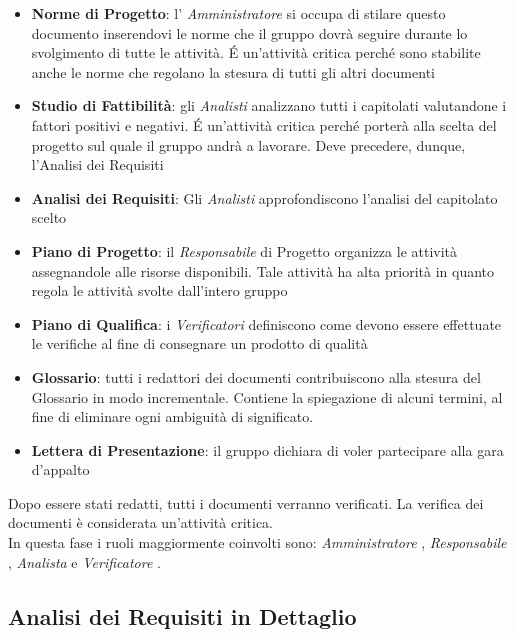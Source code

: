 \begin{itemize}
\item \textbf{Norme di Progetto}: l’ \emph{Amministratore}  si occupa di stilare questo documento
  inserendovi le norme che il gruppo dovrà seguire durante lo svolgimento di tutte
  le attività. \'E un'attività critica perché sono stabilite anche le norme
  che regolano la stesura di tutti gli altri documenti

\item \textbf{Studio di Fattibilità}: gli  \emph{Analisti}  analizzano tutti i capitolati valutandone
  i fattori positivi e negativi. \'E un'attività critica perché porterà alla scelta del
  progetto sul quale il gruppo andrà a lavorare. Deve precedere, dunque, l'Analisi dei
  Requisiti

\item \textbf{Analisi dei Requisiti}: Gli  \emph{Analisti}  approfondiscono l'analisi del capitolato
  scelto

\item \textbf{Piano di Progetto}: il  \emph{Responsabile}  di Progetto organizza le attività assegnandole
  alle risorse disponibili. Tale attività ha alta priorità in quanto regola le attività
  svolte dall’intero gruppo

\item \textbf{Piano di Qualifica}: i  \emph{Verificatori}  definiscono come devono essere effettuate le
  verifiche al fine di consegnare un prodotto di qualità

\item \textbf{Glossario}: tutti i redattori dei documenti contribuiscono alla stesura del
  Glossario in modo incrementale. Contiene la spiegazione di alcuni termini, al fine di
  eliminare ogni ambiguità di significato.

\item \textbf{Lettera di Presentazione}: il gruppo dichiara di voler partecipare alla gara d'appalto

\end{itemize}

Dopo essere stati redatti, tutti i documenti verranno  verificati. La verifica dei
documenti è considerata un'attività critica.\\
In questa fase i ruoli maggiormente coinvolti sono:  \emph{Amministratore} ,  \emph{Responsabile} ,
 \emph{Analista}  e  \emph{Verificatore} .

\subsection{Analisi dei Requisiti in Dettaglio}

